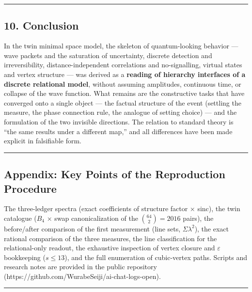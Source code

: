 \documentclass[
]{article}
\begin{document}
\begin{center}\rule{0.5\linewidth}{0.5pt}\end{center}

\subsection{10. Conclusion}\label{conclusion}

In the twin minimal space model, the skeleton of quantum-looking
behavior --- wave packets and the saturation of uncertainty, discrete
detection and irreversibility, distance-independent correlations and
no-signalling, virtual states and vertex structure --- was derived as a
\textbf{reading of hierarchy interfaces of a discrete relational model},
without assuming amplitudes, continuous time, or collapse of the wave
function. What remains are the constructive tasks that have converged
onto a single object --- the factual structure of the event (settling
the measure, the phase connection rule, the analogue of setting choice)
--- and the formulation of the two invisible directions. The relation to
standard theory is ``the same results under a different map,'' and all
differences have been made explicit in falsifiable form.

\begin{center}\rule{0.5\linewidth}{0.5pt}\end{center}

\subsection{Appendix: Key Points of the Reproduction
Procedure}\label{appendix-key-points-of-the-reproduction-procedure}

The three-ledger spectra (exact coefficients of structure factor ×
sinc), the twin catalogue (\(B_4\) × swap canonicalization of the
\(\binom{64}{2}=2016\) pairs), the before/after comparison of the first
measurement (line sets, \(\Sigma\lambda^2\)), the exact rational
comparison of the three measures, the line classification for the
relational-only readout, the exhaustive inspection of vertex closure and
\(\varepsilon\) bookkeeping (\(s\le13\)), and the full enumeration of
cubic-vertex paths. Scripts and research notes are provided in the
public repository (https://github.com/WurabeSeiji/ai-chat-logs-open).

\begin{center}\rule{0.5\linewidth}{0.5pt}\end{center}
\end{document}
